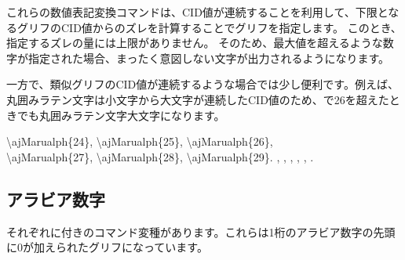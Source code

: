 \documentclass[uplatex, dvipdfmx, paper=a4paper, line_length=45zw, head_space=7zw, foot_space=10zw]{jlreq}
\newcommand{\optast}{\eghostguarded{\texttt{\textasteriskcentered}}}
\begin{document}
これらの数値表記変換コマンドは、CID値が連続することを利用して、下限となるグリフのCID値からのズレを計算することでグリフを指定します。
このとき、指定するズレの量には上限がありません。
そのため、最大値を超えるような数字が指定された場合、まったく意図しない文字が出力されるようになります。

一方で、類似グリフのCID値が連続するような場合では少し便利です。例えば、丸囲みラテン文字は小文字から大文字が連続したCID値のため、で26を超えたときでも丸囲みラテン文字大文字になります。

\begin{demosource}
  {\textbackslash}ajMarualph\{24\},
  {\textbackslash}ajMarualph\{25\},
  {\textbackslash}ajMarualph\{26\},\\
  {\textbackslash}ajMarualph\{27\},
  {\textbackslash}ajMarualph\{28\},
  {\textbackslash}ajMarualph\{29\}.
  \tcblower
  \ibmfamily
  ,
  ,
  ,
  ,
  ,
  .
\end{demosource}

\newpage
\subsection{アラビア数字}

それぞれに{\optast}付きのコマンド変種があります。これらは1桁のアラビア数字の先頭に0が加えられたグリフになっています。
\end{document}
